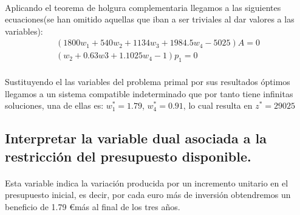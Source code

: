 \documentclass[10pt, a4paper]{article}
\begin{document}
			\paragraph{}
			Aplicando el teorema de holgura complementaria llegamos a las siguientes ecuaciones(se han omitido aquellas que iban a ser triviales al dar valores a las variables):
			\[
			\begin{split}
				(1800w_{1} + 540w_{2} + 1134w_{3} + 1984.5w_{4} - 5025)A = 0 \\
				(w_{2} +0.63w{3} + 1.1025w_{4} - 1)p_{1} = 0 \\
			\end{split}
			\]

			Sustituyendo el las variables del problema primal por sus resultados óptimos llegamos a un sistema compatible indeterminado que por tanto tiene infinitas soluciones, una de ellas es: \(w_{1}^{*} = 1.79 \), \(w_{4}^{*} = 0.91 \), lo cual resulta en \(z^{*} = 29025\)


		\subsection{Interpretar la variable dual asociada a la restricción del presupuesto disponible.}

			\paragraph{}
			Esta variable indica la variación producida por un incremento unitario en el presupuesto inicial, es decir, por cada euro más de inversión obtendremos un beneficio de 1.79 \euro más al final de los tres años.
\end{document}
